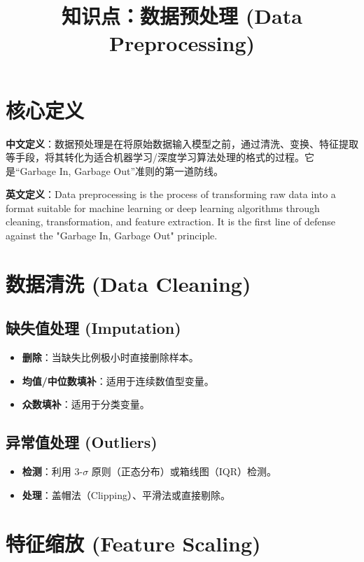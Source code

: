 \documentclass[12pt, a4paper]{article}
\title{知识点：数据预处理 (Data Preprocessing)}
\author{}
\date{}
\begin{document}
\maketitle

\section{核心定义}
\textbf{中文定义}：数据预处理是在将原始数据输入模型之前，通过清洗、变换、特征提取等手段，将其转化为适合机器学习/深度学习算法处理的格式的过程。它是“Garbage In, Garbage Out”准则的第一道防线。

\textbf{英文定义}：Data preprocessing is the process of transforming raw data into a format suitable for machine learning or deep learning algorithms through cleaning, transformation, and feature extraction. It is the first line of defense against the "Garbage In, Garbage Out" principle.

\section{数据清洗 (Data Cleaning)}

\subsection{缺失值处理 (Imputation)}
\begin{itemize}
    \item \textbf{删除}：当缺失比例极小时直接删除样本。
    \item \textbf{均值/中位数填补}：适用于连续数值型变量。
    \item \textbf{众数填补}：适用于分类变量。
\end{itemize}

\subsection{异常值处理 (Outliers)}
\begin{itemize}
    \item \textbf{检测}：利用 3-$\sigma$ 原则（正态分布）或箱线图（IQR）检测。
    \item \textbf{处理}：盖帽法（Clipping）、平滑法或直接剔除。
\end{itemize}

\section{特征缩放 (Feature Scaling)}
\end{document}
